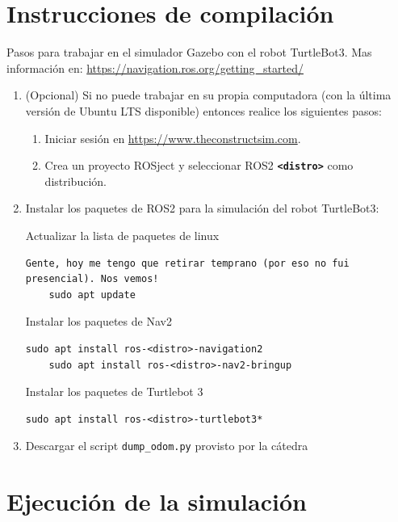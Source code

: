 \documentclass[tp]{lcc}
\begin{document}
\section{Instrucciones de compilación}
Pasos para trabajar en el simulador Gazebo con el robot TurtleBot3. Mas información en: \url{https://navigation.ros.org/getting_started/}

\begin{enumerate}

\item (Opcional) Si no puede trabajar en su propia computadora (con la última versión de Ubuntu LTS disponible) entonces realice los siguientes pasos:

\begin{enumerate}
	\item Iniciar sesión en \url{https://www.theconstructsim.com}.
	\item Crea un proyecto ROSject y seleccionar ROS2 {\bf \lstinline[style=bash]{<distro>}} como distribución.
\end{enumerate}


\item Instalar los paquetes de ROS2 para la simulación del robot TurtleBot3:

Actualizar la lista de paquetes de linux
\begin{lstlisting}[style=bash] Gente, hoy me tengo que retirar temprano (por eso no fui presencial). Nos vemos!
    sudo apt update
\end{lstlisting}

Instalar los paquetes de Nav2 
\begin{lstlisting}[style=bash] 
	sudo apt install ros-<distro>-navigation2
	sudo apt install ros-<distro>-nav2-bringup
\end{lstlisting}

Instalar los paquetes de Turtlebot 3
\begin{lstlisting}[style=bash] 
	sudo apt install ros-<distro>-turtlebot3*
\end{lstlisting}

	\item Descargar el script \lstinline[style=bash]{dump_odom.py} provisto por la cátedra
	
\end{enumerate}

\section{Ejecución de la simulación}
\end{document}
